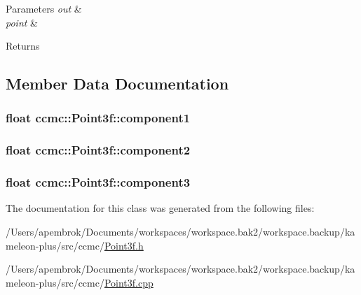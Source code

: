 \begin{DoxyParams}{Parameters}
{\em out} & \\
\hline
{\em point} & \\
\hline
\end{DoxyParams}
\begin{DoxyReturn}{Returns}

\end{DoxyReturn}


\subsection{Member Data Documentation}
\hypertarget{classccmc_1_1_point3f_a3e9b0696019ec1577083dc8d2918ea46}{
\subsubsection[{component1}]{\setlength{\rightskip}{0pt plus 5cm}float ccmc\-::\-Point3f\-::component1}}\label{classccmc_1_1_point3f_a3e9b0696019ec1577083dc8d2918ea46}
\hypertarget{classccmc_1_1_point3f_adc52014c3135cbf699d7785e901e18a3}{
\subsubsection[{component2}]{\setlength{\rightskip}{0pt plus 5cm}float ccmc\-::\-Point3f\-::component2}}\label{classccmc_1_1_point3f_adc52014c3135cbf699d7785e901e18a3}
\hypertarget{classccmc_1_1_point3f_a9f6adb1d63a8d54913c30e1b62b118fd}{
\subsubsection[{component3}]{\setlength{\rightskip}{0pt plus 5cm}float ccmc\-::\-Point3f\-::component3}}\label{classccmc_1_1_point3f_a9f6adb1d63a8d54913c30e1b62b118fd}


The documentation for this class was generated from the following files\-:\begin{DoxyCompactItemize}
\item 
/\-Users/apembrok/\-Documents/workspaces/workspace.\-bak2/workspace.\-backup/kameleon-\/plus/src/ccmc/\hyperlink{_point3f_8h}{Point3f.\-h}\item 
/\-Users/apembrok/\-Documents/workspaces/workspace.\-bak2/workspace.\-backup/kameleon-\/plus/src/ccmc/\hyperlink{_point3f_8cpp}{Point3f.\-cpp}\end{DoxyCompactItemize}
